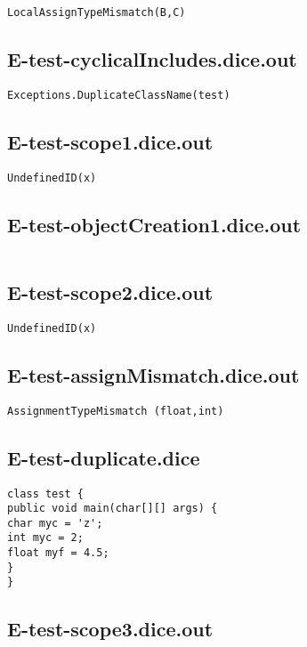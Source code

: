\begin{verbatim}
LocalAssignTypeMismatch(B,C)

\end{verbatim}\pagebreak\subsection{E-test-cyclicalIncludes.dice.out}
\begin{verbatim}
Exceptions.DuplicateClassName(test)

\end{verbatim}\pagebreak\subsection{E-test-scope1.dice.out}
\begin{verbatim}
UndefinedID(x)

\end{verbatim}\pagebreak\subsection{E-test-objectCreation1.dice.out}
\begin{verbatim}

\end{verbatim}\pagebreak\subsection{E-test-scope2.dice.out}
\begin{verbatim}
UndefinedID(x)

\end{verbatim}\pagebreak\subsection{E-test-assignMismatch.dice.out}
\begin{verbatim}
AssignmentTypeMismatch (float,int)

\end{verbatim}\pagebreak\subsection{E-test-duplicate.dice}
\begin{verbatim}
class test {
public void main(char[][] args) {
char myc = 'z';
int myc = 2;
float myf = 4.5;
}
}
\end{verbatim}\pagebreak\subsection{E-test-scope3.dice.out}
